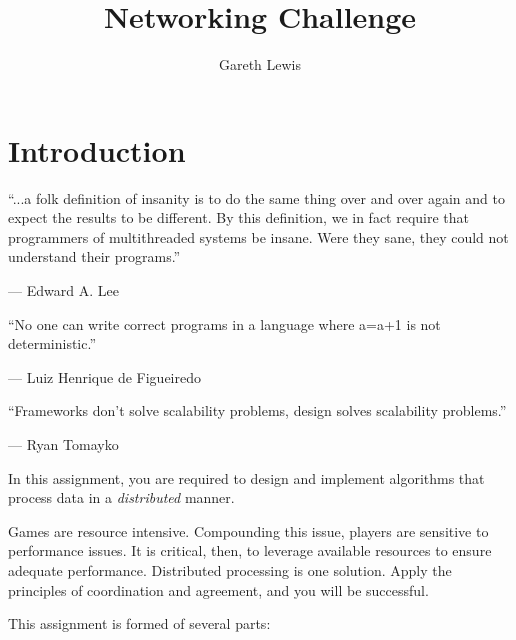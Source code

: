 \documentclass{../../../fal_assignment}
\title{Networking Challenge}
\author{Gareth Lewis}
\begin{document}
\maketitle

\section*{Introduction}

\begin{marginquote}
``...a folk definition of insanity is to do the same thing over and over again and to expect the results to be different. By this definition, we in fact require that programmers of multithreaded systems be insane. Were they sane, they could not understand their programs.''

--- Edward A. Lee

\marginquoterule

``No one can write correct programs in a language where a=a+1 is not deterministic.''

\par --- Luiz Henrique de Figueiredo

\marginquoterule

``Frameworks don't solve scalability problems, design solves scalability problems.''

\par --- Ryan Tomayko

\end{marginquote}

In this assignment, you are required to design and implement algorithms that process data in a \textit{distributed} manner.

Games are resource intensive. Compounding this issue, players are sensitive to performance issues. It is critical, then, to leverage available resources to ensure adequate performance. Distributed processing is one solution. Apply the principles of coordination and agreement, and you will be successful. 

This assignment is formed of several parts:
\end{document}

